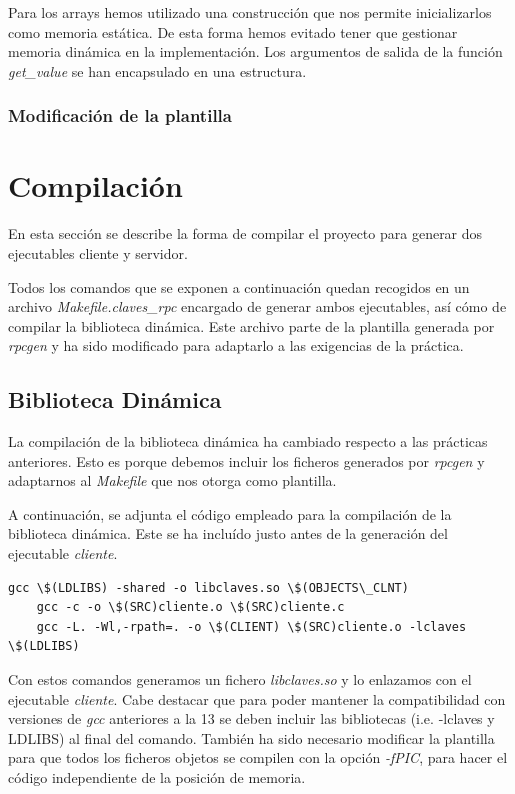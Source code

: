 \documentclass[]{article}
\begin{document}
Para los arrays hemos utilizado una construcción que nos permite inicializarlos como memoria estática. De esta forma hemos evitado tener que gestionar memoria dinámica en la implementación. Los argumentos de salida de la función \textit{get\_value} se han encapsulado en una estructura.  

\subsubsection{Modificación de la plantilla}
\label{subsec::modificacion_plantilla}

\section{Compilación}
\label{sec:compilacion}
En esta sección se describe la forma de compilar el proyecto para generar dos ejecutables cliente y servidor.

Todos los comandos que se exponen a continuación quedan recogidos en un archivo \textit{Makefile.claves\_rpc} encargado de generar ambos ejecutables, así cómo de compilar la biblioteca dinámica. Este archivo parte de la plantilla generada por \textit{rpcgen} y ha sido modificado para adaptarlo a las exigencias de la práctica.  

\subsection{Biblioteca Dinámica}
\label{subsec:biblioteca}
La compilación de la biblioteca dinámica ha cambiado respecto a las prácticas anteriores. Esto es porque debemos incluir los ficheros generados por \textit{rpcgen} y adaptarnos al \textit{Makefile} que nos otorga como plantilla.

A continuación, se adjunta el código empleado para la compilación de la biblioteca dinámica. Este se ha incluído justo antes de la generación del ejecutable \textit{cliente}. 
\begin{center}
\begin{lstlisting}[caption=Compiación de biblioteca dinámica]
gcc \$(LDLIBS) -shared -o libclaves.so \$(OBJECTS\_CLNT)
	gcc -c -o \$(SRC)cliente.o \$(SRC)cliente.c
	gcc -L. -Wl,-rpath=. -o \$(CLIENT) \$(SRC)cliente.o -lclaves \$(LDLIBS)

\end{lstlisting}
\end{center}

Con estos comandos generamos un fichero \textit{libclaves.so} y lo enlazamos con el ejecutable \textit{cliente}. Cabe destacar que para poder mantener la compatibilidad con versiones de \textit{gcc} anteriores a la 13 se deben incluir las bibliotecas (i.e. -lclaves y LDLIBS) al final del comando. También ha sido necesario modificar la plantilla para que todos los ficheros objetos se compilen con la opción \textit{-fPIC}, para hacer el código independiente de la posición de memoria. 
\end{document}
